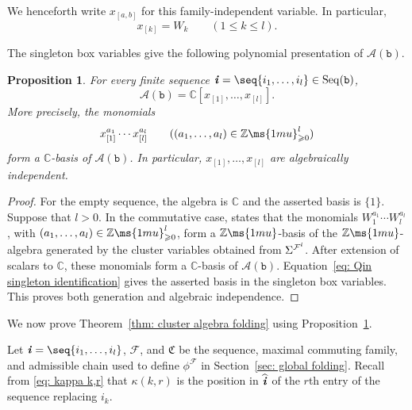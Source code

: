\documentclass[12pt, leqno]{amsart}
\numberwithin{equation}{section}
\theoremstyle{plain}
\newtheorem{proposition}[lemma]{Proposition}
\theoremstyle{definition}
\renewcommand{\le}{\leqslant}
\renewcommand{\ge}{\geqslant}
\newcommand{\C}{\mathbb{C}}
\newcommand{\Z}{\mathbb{Z}\ms{1mu}}
\newcommand{\ii}{ \textbf{\textit{i}}}
\newcommand{\hii}{{\widehat{\ii}}}
\newcommand{\frakC}{\mathfrak{C}}
\newcommand{\calA}{\mathcal{A}}
\newcommand{\calF}{\mathcal{F}}
\newcommand{\ttb}{\mathtt{b}}
\newcommand{\Seq}{\mathrm{Seq}}
\begin{document}
We henceforth write $x_{[a,b]}$ for this family-independent variable.
In particular,
\begin{equation}
x_{[k]}=W_k
\qquad(1\le k\le l).
\label{eq: Qin singleton identification}
\end{equation}

The singleton box variables give the following polynomial presentation
of $\calA(\ttb)$.

\begin{proposition}
\label{prop: singleton polynomial presentation}
For every finite sequence $\ii=\seq{i_1,\ldots,i_l}\in\Seq(\ttb)$,
\[
\calA(\ttb)=\C[x_{[1]},\ldots,x_{[l]}].
\]
More precisely, the monomials
\[
x_{[1]}^{a_1}\cdots x_{[l]}^{a_l}
\qquad ((a_1,\ldots,a_l)\in\Z_{\ge0}^l)
\]
form a $\C$-basis of $\calA(\ttb)$.  In particular,
$x_{[1]},\ldots,x_{[l]}$ are algebraically independent.
\end{proposition}

\begin{proof}
For the empty sequence, the algebra is $\C$ and the asserted basis
is $\{1\}$.  Suppose that $l>0$.
In the commutative case, \cite[Theorem~3.6(1)]{Qin24B} states that
the monomials $W_1^{a_1}\cdots W_l^{a_l}$, with
$(a_1,\ldots,a_l)\in\Z_{\ge0}^l$, form a $\Z$-basis of the
$\Z$-algebra generated by the cluster variables obtained from
$\Sigma^{\calF^\ii}$.
After extension of scalars to $\C$, these monomials form a $\C$-basis
of $\calA(\ttb)$.  Equation~\eqref{eq: Qin singleton identification}
gives the asserted basis in the singleton box variables.  This proves
both generation and algebraic independence.
\end{proof}

We now prove Theorem~\ref{thm: cluster algebra folding} using
Proposition~\ref{prop: singleton polynomial presentation}.

Let $\ii=\seq{i_1,\ldots,i_l}$, $\calF$, and $\frakC$ be the sequence,
maximal commuting family, and admissible chain used to define
$\phi^\calF$ in Section~\ref{sec: global folding}.
Recall from \eqref{eq: kappa k,r} that $\kappa(k,r)$ is the position
in $\hii$ of the $r$th entry of the sequence replacing $i_k$.
\end{document}
